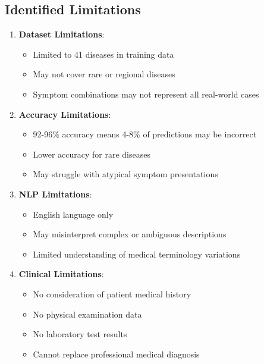 \subsection{Identified Limitations}
\begin{enumerate}
    \item \textbf{Dataset Limitations}: 
    \begin{itemize}
        \item Limited to 41 diseases in training data
        \item May not cover rare or regional diseases
        \item Symptom combinations may not represent all real-world cases
    \end{itemize}
    
    \item \textbf{Accuracy Limitations}:
    \begin{itemize}
        \item 92-96\% accuracy means 4-8\% of predictions may be incorrect
        \item Lower accuracy for rare diseases
        \item May struggle with atypical symptom presentations
    \end{itemize}
    
    \item \textbf{NLP Limitations}:
    \begin{itemize}
        \item English language only
        \item May misinterpret complex or ambiguous descriptions
        \item Limited understanding of medical terminology variations
    \end{itemize}
    
    \item \textbf{Clinical Limitations}:
    \begin{itemize}
        \item No consideration of patient medical history
        \item No physical examination data
        \item No laboratory test results
        \item Cannot replace professional medical diagnosis
    \end{itemize}
\end{enumerate}

